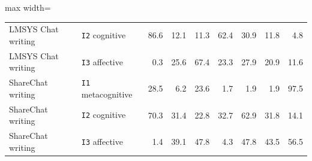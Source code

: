 \begin{table}[p]
\begin{adjustbox}{max width=\textwidth}
\begin{tabular}{@{}llrrrrrrr@{}}
LMSYS Chat writing & \texttt{I2} cognitive & 86.6 & 12.1 & 11.3 & 62.4 & 30.9 & 11.8 & 4.8 \\
LMSYS Chat writing & \texttt{I3} affective & 0.3 & 25.6 & 67.4 & 23.3 & 27.9 & 20.9 & 11.6 \\
\addlinespace
ShareChat writing & \texttt{I1} metacognitive & 28.5 & 6.2 & 23.6 & 1.7 & 1.9 & 1.9 & 97.5 \\
ShareChat writing & \texttt{I2} cognitive & 70.3 & 31.4 & 22.8 & 32.7 & 62.9 & 31.8 & 14.1 \\
ShareChat writing & \texttt{I3} affective & 1.4 & 39.1 & 47.8 & 4.3 & 47.8 & 43.5 & 56.5 \\
\bottomrule
\end{tabular}
\end{adjustbox}
\end{table}
